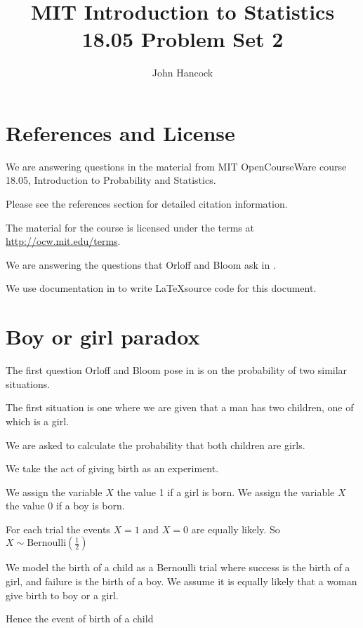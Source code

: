 \documentclass[a4paper,11pt]{article}
\author{John Hancock}
\title{MIT Introduction to Statistics 18.05 Problem Set 2 }
\begin{document}
\maketitle
\tableofcontents
\section{References and License}
We are answering questions in the material from MIT OpenCourseWare
course 18.05, Introduction to Probability and Statistics.

Please see the references section for detailed citation information.

The material for the course is licensed under the terms at 
\url{http://ocw.mit.edu/terms}.

We are answering the questions that Orloff and Bloom ask in
\cite{probSet2}.

We use documentation in  to write \LaTeX source code
for this document.

\section{Boy or girl paradox}
The first question Orloff and Bloom pose in \cite{probSet2} is
on the probability of two similar situations.

The first situation is one where we are given that a man has
two children, one of which is a girl.

We are asked to calculate the probability that both children
are girls.

We take the act of giving birth as an experiment.

We assign the variable $X$ the value 1 if a girl is
born. We assign the variable $X$ the value 0 if a
boy is born.

For each trial the events $X =1$ and $X = 0$ are
equally likely.  So $X \sim \text{Bernoulli} \left( \frac{1}{2} \right)$

We model the birth of a child as a Bernoulli trial
\cite{reading4}
where success is the birth of a girl, and failure
is the birth of a boy.  
We assume it is equally likely that a woman give
birth to boy or a girl.

Hence the event of birth of a child 
\printbibliography{}
\end{document}
